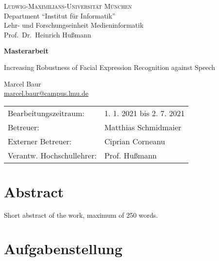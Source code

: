 \documentclass[11pt,a4paper,twoside]{article}
\begin{document}
\pagestyle{empty} %

\begin{center}
\textsc{Ludwig-Maximilians-Universität München}\\
Department ``Institut für Informatik''\\
Lehr- und Forschungseinheit Medieninformatik\\
Prof.\ Dr.\ Heinrich Hußmann

\vspace{5cm}
{\large\textbf{Masterarbeit}}\vspace{.5cm}

{\LARGE Increasing Robustness of Facial Expression Recognition against Speech}\vspace{1cm}

{\large Marcel Baur}\\\href{mailto:marcel.baur@campus.lmu.de}{marcel.baur@campus.lmu.de}

\end{center}
\vfill

\begin{tabular}{ll}
Bearbeitungszeitraum: & 1. 1. 2021 bis 2. 7. 2021\\
Betreuer: & Matthias Schmidmaier\\
Externer Betreuer: & Ciprian Corneanu\\
Verantw. Hochschullehrer: & Prof. Hußmann
\end{tabular}

\clearpage


\section*{Abstract}

Short abstract of the work, maximum of 250 words.

\clearpage
\section*{Aufgabenstellung}
\end{document}
